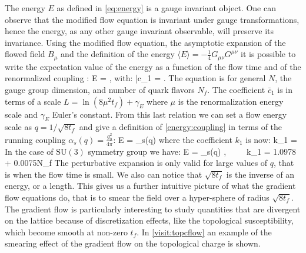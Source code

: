 The energy $E$ as defined in \cref{eq:energy} is a gauge invariant object. One can observe that the modified flow equation is invariant under gauge transformations, hence the energy, as any other gauge invariant observable, will preserve its invariance. 
Using the modified flow equation, the asymptotic expansion of the flowed field $B_\mu$ and the definition of the energy  $\langle E\rangle = -\frac{1}{4}G_{\mu\nu}G^{\mu\nu}$ it is possible to write the expectation value of the energy as a function of the flow time and of the renormalized coupling \cite{luscher_properties_2010}:
\beq
    \langle E \rangle = ,
    \label{energy:coupling}
\eeq
with:
\beq
    \bar c_1 =   .
\eeq
The equation is for general $N$, the gauge group dimension, and number of quark flavors $N_f$. The coefficient $\bar c_1$ is in terms of a scale $L=\ln(8\mu^2t_f) + \gamma_E$ where $\mu$ is the renormalization energy scale and $\gamma_E$ Euler's constant. From this last relation we can set a flow energy scale as $q=1/\sqrt{8t_f}$ and give a definition of \cref{energy:coupling} in terms of the running coupling $\alpha_s(q) = \frac{g_0^2}{4\pi}$:
\beq
    \langle E \rangle =  \alpha_s(q) 
\eeq
where the coefficient $k_1$ is now:
\beq
   k_1 =   
\eeq
In the case of $\mathrm{SU}(3)$ symmetry group we have:
\beq
    \langle E \rangle =  \alpha_s(q) ,~~~~~k_1 = 1.0978 + 0.0075\times N_f
    \label{energy_flow}
\eeq
The perturbative expansion is only valid for large values of $q$, that is when the flow time is small. We also can notice that $\sqrt{8t_f}$ is the inverse of an energy, or a length. This gives us a further intuitive picture of what the gradient flow equations do, that is to smear the field over a hyper-sphere of radius $\sqrt{8t_f}$. The gradient flow is particularly interesting to study quantities that are divergent on the lattice because of discretization effects, like the topological susceptibility, which become smooth at non-zero $t_f$. In \cref{visit:topcflow} an example of the smearing effect of the gradient flow on the topological charge is shown.  

